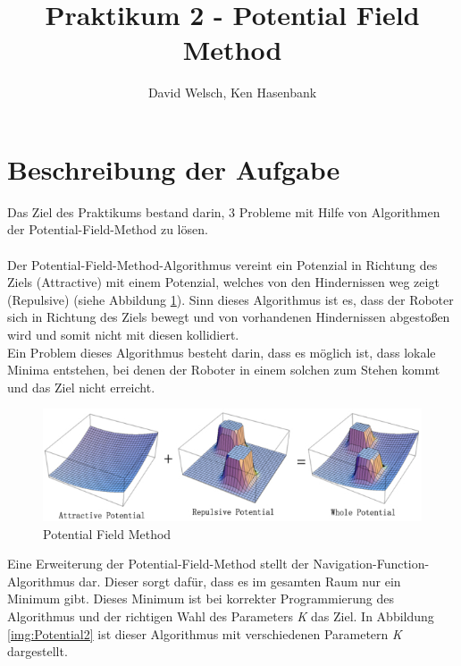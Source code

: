 \documentclass[a4paper]{scrartcl}
\begin{document}
\titlehead{Wintersemester 2017/2018\\Motion Planning\\Prof. Horsch, Rudi Scheitler}
\author{David Welsch, Ken Hasenbank}
\title{Praktikum 2 - Potential Field Method}
\maketitle

\section*{Beschreibung der Aufgabe}

Das Ziel des Praktikums bestand darin, 3 Probleme mit Hilfe von Algorithmen der Potential-Field-Method zu lösen.
\\\\
Der Potential-Field-Method-Algorithmus vereint ein Potenzial in Richtung des Ziels (Attractive) mit einem Potenzial, welches von den Hindernissen weg zeigt (Repulsive) (siehe Abbildung \ref{img:Potential}). Sinn dieses Algorithmus ist es, dass der Roboter sich in Richtung des Ziels bewegt und von vorhandenen Hindernissen abgestoßen wird und somit nicht mit diesen kollidiert.\\ 
Ein Problem dieses Algorithmus besteht darin, dass es möglich ist, dass lokale Minima entstehen, bei denen der Roboter in einem solchen zum Stehen kommt und das Ziel nicht erreicht.\\
\begin{figure}[h!]
\includegraphics[width=\textwidth]{potential-field1_robot.jpg}
\caption{Potential Field Method}
\label{img:Potential}
\end{figure}

Eine Erweiterung der Potential-Field-Method stellt der Navigation-Function-Algorithmus dar. Dieser sorgt dafür, dass es im gesamten Raum nur ein Minimum gibt. Dieses Minimum ist bei korrekter Programmierung des Algorithmus und der richtigen Wahl des Parameters \textit{K} das Ziel. In Abbildung \ref{img:Potential2} ist dieser Algorithmus mit verschiedenen Parametern \textit{K} dargestellt.\\
\end{document}
